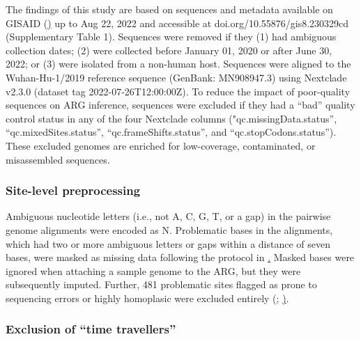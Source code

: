 \documentclass{article}
\begin{document}
The findings of this study are based on sequences and metadata available on GISAID (\href{https://gisaid.org/}) up to Aug 22, 2022 and accessible at doi.org/10.55876/gis8.230329cd (Supplementary Table 1). Sequences were removed if they (1) had ambiguous collection dates; (2) were collected before January 01, 2020 or after June 30, 2022; or (3) were isolated from a non-human host. Sequences were aligned to the Wuhan-Hu-1/2019 reference sequence (GenBank: MN908947.3) using Nextclade v2.3.0 \cite{Aksamentov2021-hj} (dataset tag 2022-07-26T12:00:00Z). To reduce the impact of poor-quality sequences on ARG inference, sequences were excluded if they had a “bad” quality control status in any of the four Nextclade columns ("qc.missingData.status”, “qc.mixedSites.status”, “qc.frameShifts.status”, and “qc.stopCodons.status”). These excluded genomes are enriched for low-coverage, contaminated, or misassembled sequences.

\subsubsection{Site-level preprocessing}

Ambiguous nucleotide letters (i.e., not A, C, G, T, or a gap) in the pairwise genome alignments were encoded as N. Problematic bases in the alignments, which had two or more ambiguous letters or gaps within a distance of seven bases, were masked as missing data following the protocol in \href{https://github.com/roblanf/sarscov2phylo/}. Masked bases were ignored when attaching a sample genome to the ARG, but they were subsequently imputed. Further, 481 problematic sites flagged as prone to sequencing errors or highly homoplasic were excluded entirely (\href{https://virological.org/t/issues-with-sars-cov-2-sequencing-data/473}; \href{https://raw.githubusercontent.com/W-L/ProblematicSites_SARS-CoV2/master/problematic_sites_sarsCov2.vcf}).

\subsubsection{Exclusion of “time travellers”}
\end{document}
